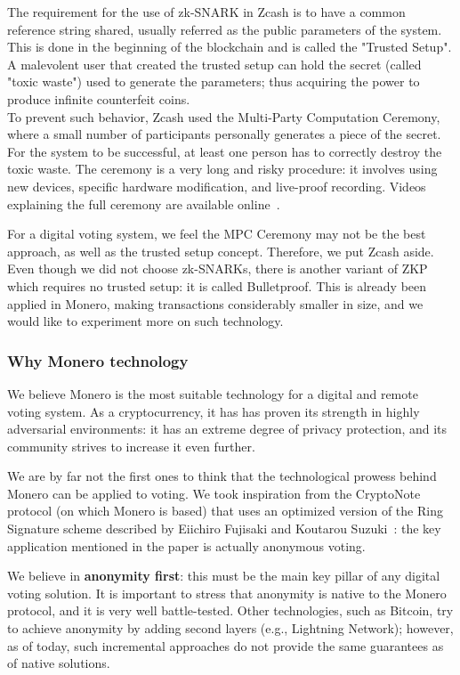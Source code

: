 \documentclass[10pt, letterpaper]{article}
\begin{document}
The requirement for the use of zk-SNARK in Zcash is to have a common reference string shared, usually referred as the public parameters of the system. This is done in the beginning of the blockchain and is called the "Trusted Setup".\\
A malevolent user that created the trusted setup can hold the secret (called "toxic waste") used to generate the parameters; thus acquiring the power to produce infinite counterfeit coins.\\
To prevent such behavior, Zcash used the Multi-Party Computation Ceremony, where a small number of participants personally generates a piece of the secret. For the system to be successful, at least one person has to correctly destroy the toxic waste.
The ceremony is a very long and risky procedure: it involves using new devices, specific hardware modification, and live-proof recording. Videos explaining the full ceremony are available online~\cite{ZcashCeremony:YouTube}.
\bigskip

For a digital voting system, we feel the MPC Ceremony may not be the best approach, as well as the trusted setup concept. Therefore, we put Zcash aside.\\
Even though we did not choose zk-SNARKs, there is another variant of ZKP which requires no trusted setup: it is called Bulletproof. This is already been applied in Monero, making transactions considerably smaller in size, and we would like to experiment more on such technology.
\subsubsection{Why Monero technology}
We believe Monero is the most suitable technology for a digital and remote voting system. As a cryptocurrency, it has has proven its strength in highly adversarial environments: it has an extreme degree of privacy protection, and its community strives to increase it even further.
\bigskip

We are by far not the first ones to think that the technological prowess behind Monero can be applied to voting. We took inspiration from the CryptoNote protocol (on which Monero is based) that uses an optimized version of the Ring Signature scheme described by Eiichiro Fujisaki and Koutarou Suzuki~\cite{10.1007/978-3-540-71677-8_13}: the key application mentioned in the paper is actually anonymous voting.
\bigskip

We believe in \textbf{anonymity first}: this must be the main key pillar of any digital voting solution. It is important to stress that anonymity is native to the Monero protocol, and it is very well battle-tested. Other technologies, such as Bitcoin, try to achieve anonymity by adding second layers (e.g., Lightning Network); however, as of today, such incremental approaches do not provide the same guarantees as of native solutions.
\bigskip
\end{document}
